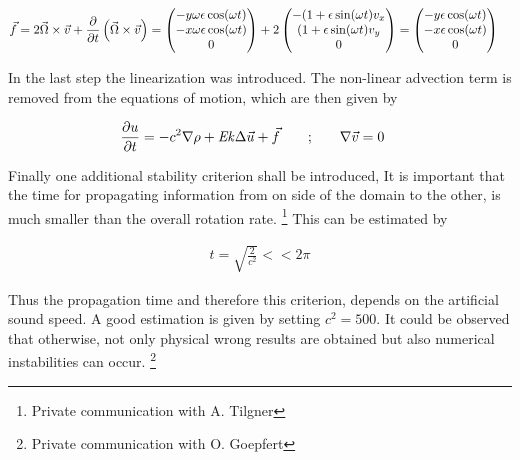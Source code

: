 \begin{align}
    \vec{f} &= 2 \vec{\Omega} \times \vec{v} + \pdn[]{t}\left(\vec{\Omega} \times \vec{v} \right)
            = \begin{pmatrix}
           -y \omega \epsilon \cos(\omega t) \\
           -x \omega \epsilon \cos(\omega t) \\
           0\\
         \end{pmatrix}
            + 2\begin{pmatrix}
           - ( 1 + \epsilon \sin(\omega t)v_x \\
             ( 1 + \epsilon \sin(\omega t)v_y \\
           0\\
         \end{pmatrix}
            = \begin{pmatrix}
           -y \epsilon \cos(\omega t) \\
           -x \epsilon \cos(\omega t) \\
           0\\
         \end{pmatrix}
\end{align}

In the last step the linearization was introduced.
The non-linear advection term is removed from the equations of motion, which
are then given by

\begin{align}
    \label{theorie:rotns}
    \pdn[u]{t} = -c^2\nabla \rho + \Ekman \Delta \vec{u} + \vec{f} \qquad;& \qquad  \nabla \vec{v} = 0
\end{align}

Finally one additional stability criterion shall be introduced,
It is important that the time for propagating information from on side of the domain
to the other, is much smaller than the overall rotation rate.
\footnote{Private communication with A. Tilgner}
This can be estimated by

\begin{align}
    t = \sqrt{\frac{2}{c^2}} << 2\pi
\end{align}

Thus the propagation time and therefore this criterion, depends on the artificial sound speed.
A good estimation is given by setting $c^2 = 500$.
It could be observed that otherwise, not only physical wrong results are obtained but also
numerical instabilities can occur.
\footnote{Private communication with O. Goepfert}

